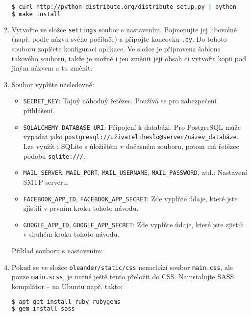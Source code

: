 \documentclass[12pt,oneside,final]{fithesis2}
\begin{document}
\begin{enumerate}
        \begin{lstlisting}[language=bash]
$ curl http://python-distribute.org/distribute_setup.py | python
$ make install
        \end{lstlisting}

    \item Vytvořte ve složce {\tt settings} soubor s nastavením. Pojmenujte jej libovolně (např. podle názvu svého počítače) a připojte koncovku {\tt .py}. Do tohoto souboru zapíšete konfiguraci aplikace. Ve složce je připravena šablona takového souboru, takže je možné i jen změnit její obsah či vytvořit kopii pod jiným názvem a tu změnit.

    \item Soubor vyplňte následovně:

        \begin{itemize}
            \item {\tt SECRET\_KEY}: Tajný náhodný řetězec. Používá se pro zabezpečení přihlášení.
            \item {\tt SQLALCHEMY\_DATABASE\_URI}: Připojení k databázi. Pro PostgreSQL může vypadat jako {\tt post\-gresql://uživa\-tel:hes\-lo@ser\-ver/ná\-zev\_data\-báze}. Lze využít i SQLite s úložištěm v dočasném souboru, potom má řetězec podobu {\tt sqlite:///}.
            \item {\tt MAIL\_SERVER}, {\tt MAIL\_PORT}, {\tt MAIL\_USER\-NAME}, {\tt MAIL\_PASS\-WORD}, atd.: Nastavení SMTP serveru.
            \item {\tt FACEBOOK\_APP\_ID}, {\tt FACEBOOK\_APP\_SECRET}: Zde vyplňte údaje, které jste zjistili v prvním kroku tohoto návodu.
            \item {\tt GOOGLE\_APP\_ID}, {\tt GOOGLE\_APP\_SECRET}: Zde vyplňte údaje, které jste zjistili v druhém kroku tohoto návodu.
        \end{itemize}

    Příklad souboru s nastavením:

        

    \item Pokud se ve složce {\tt oleander/static/css} nenachází soubor {\tt main.css}, ale pouze {\tt main.scss}, je nutné ještě tento přeložit do CSS. Nainstalujte SASS kompilátor -- na Ubuntu např. takto:

        \begin{lstlisting}[language=bash]
$ apt-get install ruby rubygems
$ gem install sass
        \end{lstlisting}


\end{enumerate}
\end{document}
